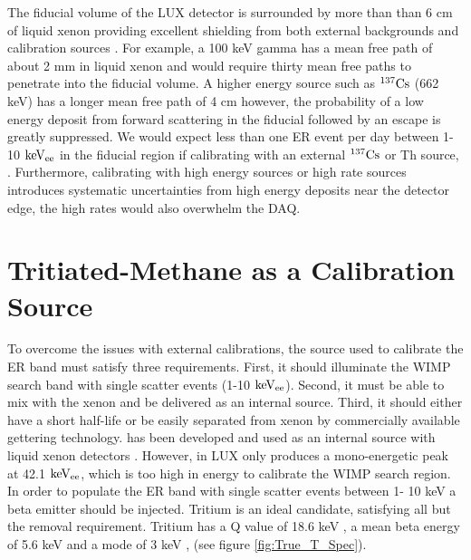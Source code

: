 The fiducial volume of the LUX detector is surrounded by more than than 6 cm of liquid xenon providing excellent shielding from both external backgrounds and calibration sources \cite{LUX_BG}. For example, a 100 keV gamma has a mean free path of about 2 mm in liquid xenon and would require thirty mean free paths to penetrate into the fiducial volume. A higher energy source such as $\rm ^{137}Cs$ (662 keV) has a longer mean free path of 4 cm however, the probability of a low energy deposit from forward scattering in the fiducial followed by an escape is greatly suppressed. We would expect less than one ER event per day between 1-10 $\rm keV_{ee}$ in the fiducial region if calibrating with an external $\rm ^{137}Cs$ or Th source, \cite{LUX_BG}. Furthermore, calibrating with high energy sources or high rate sources introduces systematic uncertainties from high energy deposits near the detector edge, the high rates would also overwhelm the DAQ.  

\section{Tritiated-Methane as a Calibration Source}
To overcome the issues with external calibrations, the source used to calibrate the ER band must satisfy three requirements. First, it should illuminate the WIMP search band with single scatter events (1-10 $\rm keV_{ee}$). Second, it must be able to mix with the xenon and be delivered as an internal source. Third, it should either have a short half-life or be easily separated from xenon by commercially available gettering technology. \KrCal has been developed and used as an internal source with liquid xenon detectors \cite{Kastens} \cite{Baudis}. However, in LUX \KrCal only produces a mono-energetic peak at 42.1 $\rm keV_{ee}$, which is too high in energy to calibrate the WIMP search region. In order to populate the ER band with single scatter events between 1- 10 keV a beta emitter should be injected. Tritium is an ideal candidate, satisfying all but the removal requirement. Tritium has a Q value of 18.6 keV \cite{Tritium_Q}, a mean beta energy of 5.6 keV \cite{Tritium_Mean} and a mode of 3 keV \cite{Tritium_Eq}, (see figure \ref{fig:True_T_Spec}).


